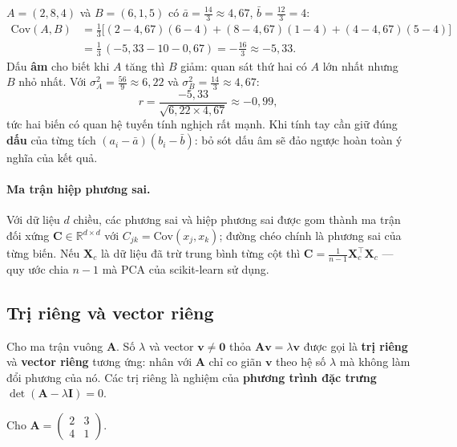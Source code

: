 \begin{example}
$A = (2, 8, 4)$ và $B = (6, 1, 5)$ có $\bar{a} = \frac{14}{3} \approx 4{,}67$, $\bar{b} = \frac{12}{3} = 4$:
\begin{align*}
    \mathrm{Cov}(A, B) &= \tfrac{1}{3}\big[(2 - 4{,}67)(6 - 4) + (8 - 4{,}67)(1 - 4) + (4 - 4{,}67)(5 - 4)\big] \\
    &= \tfrac{1}{3}\,(-5{,}33 - 10 - 0{,}67) = -\tfrac{16}{3} \approx -5{,}33.
\end{align*}
Dấu \textbf{âm} cho biết khi $A$ tăng thì $B$ giảm: quan sát thứ hai có $A$ lớn nhất nhưng $B$ nhỏ nhất. Với $\sigma_A^2 = \frac{56}{9} \approx 6{,}22$ và $\sigma_B^2 = \frac{14}{3} \approx 4{,}67$:
\[
    r = \frac{-5{,}33}{\sqrt{6{,}22 \times 4{,}67}} \approx -0{,}99,
\]
tức hai biến có quan hệ tuyến tính nghịch rất mạnh. Khi tính tay cần giữ đúng \textbf{dấu} của từng tích $(a_i - \bar{a})(b_i - \bar{b})$: bỏ sót dấu âm sẽ đảo ngược hoàn toàn ý nghĩa của kết quả.
\end{example}

\paragraph{Ma trận hiệp phương sai.} Với dữ liệu $d$ chiều, các phương sai và hiệp phương sai được gom thành ma trận đối xứng $\mathbf{C} \in \mathbb{R}^{d \times d}$ với $C_{jk} = \mathrm{Cov}(x_j, x_k)$; đường chéo chính là phương sai của từng biến. Nếu $\mathbf{X}_c$ là dữ liệu đã trừ trung bình từng cột thì $\mathbf{C} = \frac{1}{n - 1}\mathbf{X}_c^\top\mathbf{X}_c$ --- quy ước chia $n - 1$ mà PCA của scikit-learn sử dụng.

\subsection{Trị riêng và vector riêng}

\begin{definition}
Cho ma trận vuông $\mathbf{A}$. Số $\lambda$ và vector $\mathbf{v} \neq \mathbf{0}$ thỏa $\mathbf{A}\mathbf{v} = \lambda\mathbf{v}$ được gọi là \textbf{trị riêng} và \textbf{vector riêng} tương ứng: nhân với $\mathbf{A}$ chỉ co giãn $\mathbf{v}$ theo hệ số $\lambda$ mà không làm đổi phương của nó. Các trị riêng là nghiệm của \textbf{phương trình đặc trưng} $\det(\mathbf{A} - \lambda\mathbf{I}) = 0$.
\end{definition}

\begin{example}
Cho $\mathbf{A} = \begin{pmatrix} 2 & 3 \\ 4 & 1 \end{pmatrix}$.
\end{example}

